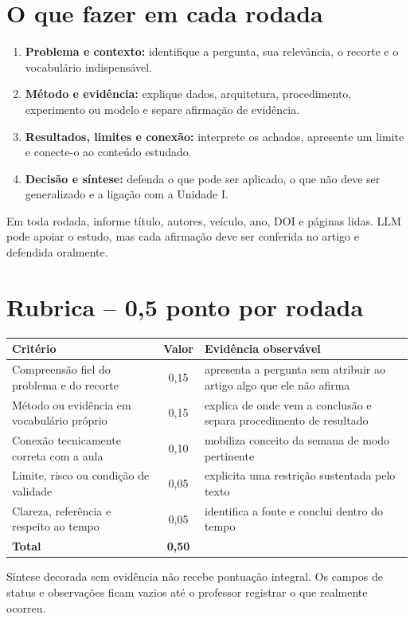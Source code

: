 \documentclass[10pt,a4paper]{article}
\begin{document}
\section*{O que fazer em cada rodada}
\begin{enumerate}
\item \textbf{Problema e contexto:} identifique a pergunta, sua relevância, o recorte e o vocabulário indispensável.
\item \textbf{Método e evidência:} explique dados, arquitetura, procedimento, experimento ou modelo e separe afirmação de evidência.
\item \textbf{Resultados, limites e conexão:} interprete os achados, apresente um limite e conecte-o ao conteúdo estudado.
\item \textbf{Decisão e síntese:} defenda o que pode ser aplicado, o que não deve ser generalizado e a ligação com a Unidade I.
\end{enumerate}
Em toda rodada, informe título, autores, veículo, ano, DOI e páginas lidas. LLM pode apoiar o estudo, mas cada afirmação deve ser conferida no artigo e defendida oralmente.

\section*{Rubrica -- 0,5 ponto por rodada}
\begin{center}
\begin{tabularx}{\textwidth}{@{}Y c Y@{}}
\toprule
\textbf{Critério} & \textbf{Valor} & \textbf{Evidência observável}\\
\midrule
Compreensão fiel do problema e do recorte & 0,15 & apresenta a pergunta sem atribuir ao artigo algo que ele não afirma\\
Método ou evidência em vocabulário próprio & 0,15 & explica de onde vem a conclusão e separa procedimento de resultado\\
Conexão tecnicamente correta com a aula & 0,10 & mobiliza conceito da semana de modo pertinente\\
Limite, risco ou condição de validade & 0,05 & explicita uma restrição sustentada pelo texto\\
Clareza, referência e respeito ao tempo & 0,05 & identifica a fonte e conclui dentro do tempo\\
\midrule
\textbf{Total} & \textbf{0,50} & \\
\bottomrule
\end{tabularx}
\end{center}
Síntese decorada sem evidência não recebe pontuação integral. Os campos de status e observações ficam vazios até o professor registrar o que realmente ocorreu.
\end{document}

